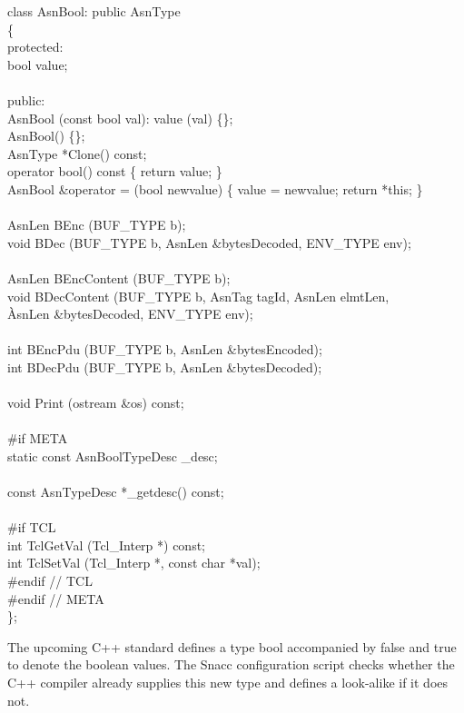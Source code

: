 \begin{Ccode}
class AsnBool: public AsnType\\
\{\\
protected:\+\\
  bool				\>\>value;\\
\\
\<public:\\
				\>\>AsnBool (const bool val): value (val) \{\};\\
				\>\>AsnBool() \{\};\\
  AsnType			\>\>*Clone() const;\\
				\>\>operator bool() const \{ return value; \}\\
  AsnBool			\>\>\&operator = (bool newvalue) \{ value = newvalue; return *this; \}\\
\\
  AsnLen			\>\>BEnc (BUF\_TYPE b);\\
  void				\>\>BDec (BUF\_TYPE b, AsnLen \&bytesDecoded, ENV\_TYPE env);\\
\\
  AsnLen			\>\>BEncContent (BUF\_TYPE b);\\
  void				\>\>BDecContent (BUF\_TYPE b, AsnTag tagId, AsnLen elmtLen,\\
					\`AsnLen \&bytesDecoded, ENV\_TYPE env);\\
\\
  int				\>\>BEncPdu (BUF\_TYPE b, AsnLen \&bytesEncoded);\\
  int				\>\>BDecPdu (BUF\_TYPE b, AsnLen \&bytesDecoded);\\
\\
  void				\>\>Print (ostream \&os) const;\\
\\
\<\#if META\\
  static const AsnBoolTypeDesc	\>\>\_desc;\\
\\
  const AsnTypeDesc		\>\>*\_getdesc() const;\\
\\
\<\#if TCL\\
  int				\>\>TclGetVal (Tcl\_Interp *) const;\\
  int				\>\>TclSetVal (Tcl\_Interp *, const char *val);\-\\
\#endif // TCL\\
\#endif // META\\
\};
\end{Ccode}

The upcoming C++ standard \cite{c++-draft} defines a type {\C bool} accompanied by {\C false} and {\C true} to denote the boolean values.
The Snacc configuration script checks whether the C++ compiler already supplies this new type and defines a look-alike if it does not.

